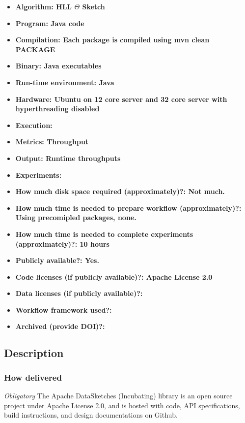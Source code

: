 \documentclass{sigplanconf}
\begin{document}
{\small
\begin{itemize}
  \item {\bf Algorithm: HLL $\Theta$ Sketch}
  \item {\bf Program: Java code}
  \item {\bf Compilation: Each package is compiled using mvn clean PACKAGE}
  \item {\bf Binary: Java executables}
  \item {\bf Run-time environment: Java}
  \item {\bf Hardware: Ubuntu on 12 core server and 32 core server with hyperthreading disabled}
  \item {\bf Execution: }
  \item {\bf Metrics: Throughput}
  \item {\bf Output: Runtime throughputs}
  \item {\bf Experiments: }
  \item {\bf How much disk space required (approximately)?: Not much.}
  \item {\bf How much time is needed to prepare workflow (approximately)?: Using precomipled packages, none.}
  \item {\bf How much time is needed to complete experiments (approximately)?: 10 hours}
  \item {\bf Publicly available?: Yes.}
  \item {\bf Code licenses (if publicly available)?: Apache License 2.0}
  \item {\bf Data licenses (if publicly available)?: }
  \item {\bf Workflow framework used?: }
  \item {\bf Archived (provide DOI)?: }
\end{itemize}

\subsection{Description}

\subsubsection{How delivered}

{\em Obligatory}
The Apache DataSketches (Incubating) library is an open source project
under Apache License 2.0, and is hosted with code, API specifications,
build instructions, and design documentations on Github.

}
\end{document}
